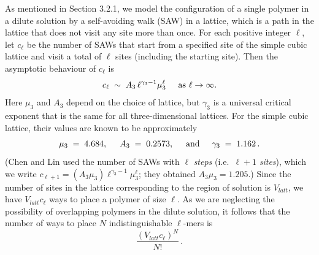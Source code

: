 \documentclass[journal=mamobx,manuscript=article]{achemso}
\begin{document}
As mentioned in Section 3.2.1, we model the configuration of a single  polymer in a dilute solution by a self-avoiding walk (SAW) in a lattice, which is a path in the lattice that does not visit any site more than once.
For each positive integer $\ell$, let $c_{\ell}$ be
the number of SAWs that start from a specified site of the simple cubic lattice and visit a total of $\ell$ sites (including the starting site).
Then the asymptotic behaviour of $c_{\ell}$ 
is\cite{Madras2013} 
\begin{equation}
    \label{eq.sawscale}
       c_{\ell}  \;\sim  \;  A_3 \, {\ell}^{\gamma_3-1}  \mu_3^{\ell}    \hspace{5mm}\hbox{as $\ell\rightarrow\infty$}.
\end{equation}
Here $\mu_3$ and $A_3$ depend on the choice of lattice, but $\gamma_3$ is a universal critical exponent
that is the same for all three-dimensional lattices.  
For the simple cubic lattice, 
their values are known to be approximately \cite{Chen2002,Madras2013}
\begin{equation}
   \label{eq.gammas}   \mu_3 \;=\;  4.684, \hspace{5mm}
        A_3 \;=\;  0.2573,    \hspace{5mm}\hbox{and}\hspace{5mm}
   \gamma_3 \;=\;  1.162 \,.  %
\end{equation}
(Chen and Lin\cite{Chen2002} used the 
number of SAWs with $\ell$ \textit{steps} (i.e.\ $\ell+1$ \textit{sites}), which we write  $c_{\ell+1}=(A_3\mu_3)\ell^{\gamma_3-1}\mu_3^{\ell}$; %
they obtained $A_3\mu_3=1.205$.)
Since the number of sites in the lattice corresponding to the region of solution is $V_{latt}$, 
we have $V_{latt}c_{\ell}$ ways to place a polymer of size ${\ell}$.  As we are neglecting the
possibility of overlapping polymers in the dilute solution, it follows that the number of ways to 
place $N$ indistinguishable $\ell$-mers is 
\begin{equation}
  \label{eq.Npoly}
   \frac{(V_{latt}c_{\ell})^N}{N!}  \,.   
\end{equation}
\end{document}
